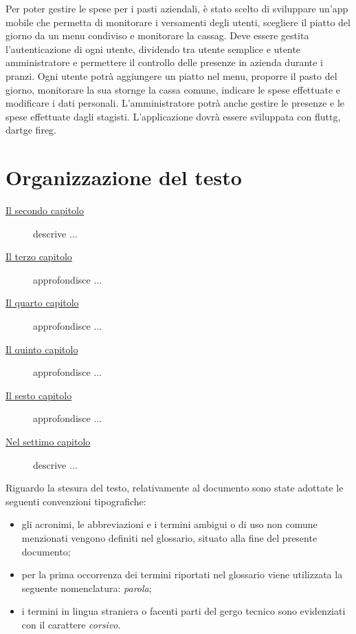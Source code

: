Per poter gestire le spese per i pasti aziendali, è stato scelto di sviluppare un'app mobile che permetta di monitorare i versamenti degli utenti, scegliere il piatto del giorno da un menu condiviso e monitorare la {\gls{cassag}}\glsfirstoccur.\newline
Deve essere gestita l'autenticazione di ogni utente, dividendo tra utente semplice e utente amministratore e permettere il controllo delle presenze in azienda durante i pranzi. \newline
Ogni utente potrà aggiungere un piatto nel menu, proporre il pasto del giorno, monitorare la sua {\gls{storng}}\glsfirstoccur e la cassa comune, indicare le spese effettuate e modificare i dati personali. \newline
L'amministratore potrà anche gestire le presenze e le spese effettuate dagli stagisti.
L'applicazione dovrà essere sviluppata con {\gls{fluttg}}\glsfirstoccur, {\gls{dartg}}\glsfirstoccur e {\gls{fireg}}\glsfirstoccur.

\section{Organizzazione del testo}

\begin{description}
    \item[{\hyperref[cap:processi-metodologie]{Il secondo capitolo}}] descrive ...
    
    \item[{\hyperref[cap:descrizione-stage]{Il terzo capitolo}}] approfondisce ...
    
    \item[{\hyperref[cap:analisi-requisiti]{Il quarto capitolo}}] approfondisce ...
    
    \item[{\hyperref[cap:progettazione-codifica]{Il quinto capitolo}}] approfondisce ...
    
    \item[{\hyperref[cap:verifica-validazione]{Il sesto capitolo}}] approfondisce ...
    
    \item[{\hyperref[cap:conclusioni]{Nel settimo capitolo}}] descrive ...
\end{description}



Riguardo la stesura del testo, relativamente al documento sono state adottate le seguenti convenzioni tipografiche:
\begin{itemize}
	\item gli acronimi, le abbreviazioni e i termini ambigui o di uso non comune menzionati vengono definiti nel glossario, situato alla fine del presente documento;
	\item per la prima occorrenza dei termini riportati nel glossario viene utilizzata la seguente nomenclatura: \emph{parola}\glsfirstoccur;
	\item i termini in lingua straniera o facenti parti del gergo tecnico sono evidenziati con il carattere \emph{corsivo}.
\end{itemize}
